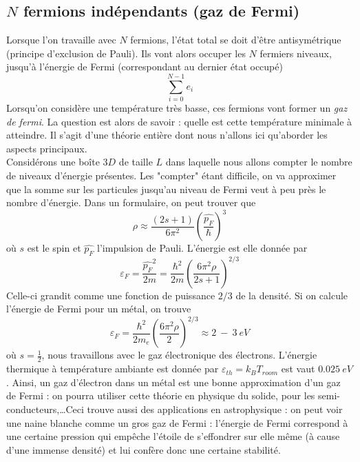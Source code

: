 \subsection{$N$ fermions indépendants (gaz de Fermi)}
Lorsque l'on travaille avec $N$ fermions, l'état total se doit d'être antisymétrique (principe d'exclusion 
de Pauli). Ils vont alors occuper les $N$ fermiers niveaux, jusqu'à l'énergie de Fermi (correspondant au 
dernier état occupé)
\begin{equation}
\sum_{i=0}^{N-1} e_i
\end{equation}
Lorsqu'on considère une température très basse, ces fermions vont former un \textit{gaz de fermi}. La question 
est alors de savoir : quelle est cette température minimale à atteindre. Il s'agit d'une théorie entière dont 
nous n'allons ici qu'aborder les aspects principaux.\\

Considérons une boîte $3D$ de taille $L$ dans laquelle nous allons compter le nombre de niveaux d'énergie 
présentes. Les "compter" étant difficile, on va approximer que la somme sur les particules jusqu'au niveau 
de Fermi veut à peu près le nombre d'énergie. Dans un formulaire, on peut trouver que
\begin{equation}
\rho \approx \dfrac{(2s+1)}{6\pi^2}\left(\dfrac{\hat{p_F}}{\hbar}\right)^3
\end{equation}
où $s$ est le spin et $\hat{p_F}$ l'impulsion de Pauli. L'énergie est elle donnée par
\begin{equation}
\varepsilon_F = \dfrac{\hat{p_F}^2}{2m}=\dfrac{\hbar^2}{2m}\left(\dfrac{6\pi^2\rho}{2s+1}\right)^{2/3}
\end{equation}
Celle-ci grandit comme une fonction de puissance $2/3$ de la densité. Si on calcule l'énergie de Fermi pour
un métal, on trouve
\begin{equation}
\varepsilon_F = \dfrac{\hbar^2}{2m_e}\left(\dfrac{6\pi^2\rho}{2}\right)^{2/3} \approx 2\ -\ 3\ eV
\end{equation}
où $s=\frac{1}{2}$, nous travaillons avec le gaz électronique des électrons.  L'énergie thermique à température 
ambiante est donnée par $\varepsilon_{th}= k_BT_{room}$ est vaut $0.025\ eV$. Ainsi, un gaz d'électron dans 
un métal est une bonne approximation d'un gaz de Fermi : on pourra utiliser cette théorie en physique du solide, 
pour les semi-conducteurs,\dots Ceci trouve aussi des applications en astrophysique : on peut voir une naine 
blanche comme un gros gaz de Fermi : l'énergie de Fermi correspond à une certaine pression qui empêche l'étoile
de s'effondrer sur elle même (à cause d'une immense densité) et lui confère donc une certaine stabilité.




